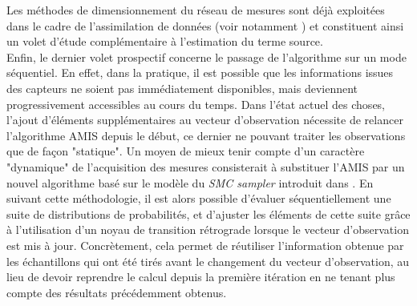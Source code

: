 Les méthodes de dimensionnement du réseau de mesures sont déjà exploitées dans le cadre de l'assimilation de données (voir notamment \cite{Abida2009}) et constituent ainsi un volet d'étude complémentaire à l'estimation du terme source.\\

Enfin, le dernier volet prospectif concerne le passage de l'algorithme sur un mode séquentiel. En effet, dans la pratique, il est possible que les informations issues des capteurs ne soient pas immédiatement disponibles, mais deviennent progressivement accessibles au cours du temps. Dans l'état actuel des choses, l'ajout d'éléments supplémentaires au vecteur d'observation nécessite de relancer l'algorithme AMIS depuis le début, ce dernier ne pouvant traiter les observations que de façon "statique". Un moyen de mieux tenir compte d'un caractère "dynamique" de l'acquisition des mesures consisterait à substituer l'AMIS par un nouvel algorithme basé sur le modèle du \textit{SMC sampler} introduit dans \cite{Delmoral2006}. En suivant cette méthodologie, il est alors possible d'évaluer séquentiellement une suite de distributions de probabilités, et d'ajuster les éléments de cette suite grâce à l'utilisation d'un noyau de transition rétrograde lorsque le vecteur d'observation est mis à jour. Concrètement, cela permet de réutiliser l'information obtenue par les échantillons qui ont été tirés avant le changement du vecteur d'observation, au lieu de devoir reprendre le calcul depuis la première itération en ne tenant plus compte des résultats précédemment obtenus.  




